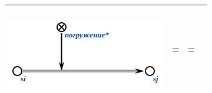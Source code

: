\begin{SCn}
{\begin{longtable}[l]{|m{6.2cm}|m{2.5cm}|m{2.5cm}|m{2.5cm}|m{2.5cm}|}
	\parbox[c]{6.2cm}{\\\centering\includegraphics[width=0.8\linewidth]{figures/intro/scs/sc.s-connectors/examples/scs_transf_insertion_const.png}\\} & \parbox[c]{2.5cm}{\centering\supset=} & \parbox[c]{2.5cm}{\centering = \subset} &    \\
	\hline
\end{longtable}
}

\bigskip
\scnendstruct {}

\scnstartsubstruct


\end{SCn}
